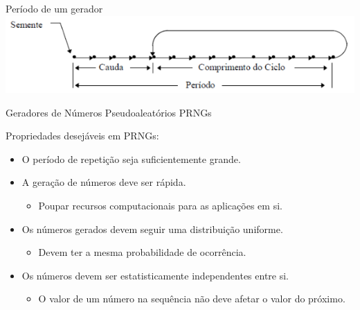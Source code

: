 \documentclass[xcolor=dvipsnames]{beamer}
\begin{document}
\begin{frame}{Período de um gerador}
    \includegraphics[width=\textwidth]{periodo}
\end{frame}

\begin{frame}{Geradores de Números Pseudoaleatórios \- PRNGs}
  \begin{block}{Propriedades desejáveis em PRNGs:}
    \begin{itemize}
      \item O período de repetição seja suficientemente grande.
      \pause
      \item A geração de números deve ser rápida.
      \pause
      \begin{itemize}
	\item Poupar recursos computacionais para as aplicações em si.
      \end{itemize}
      \pause
      \item Os números gerados devem seguir uma distribuição uniforme.
      \pause
      \begin{itemize}
	\item Devem ter a mesma probabilidade de ocorrência.
      \end{itemize}
      \pause
      \item Os números devem ser estatisticamente independentes entre si.
      \pause
      \begin{itemize}
	\item O valor de um número na sequência não deve afetar o valor do próximo.
      \end{itemize}
      \pause
    \end{itemize}
  \end{block}
\end{frame}
\end{document}

